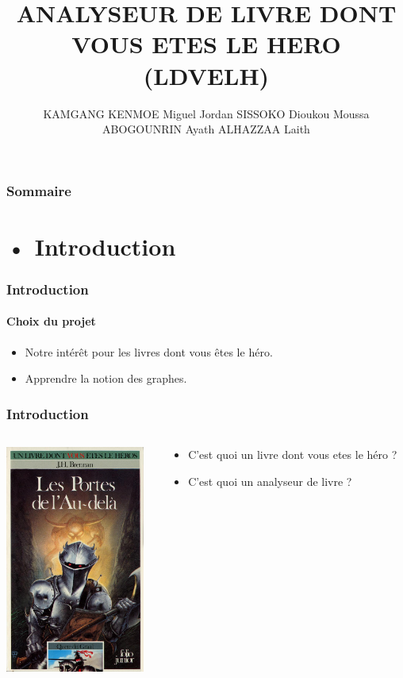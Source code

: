 \documentclass{beamer}
\title{ANALYSEUR DE LIVRE DONT VOUS ETES LE HERO (LDVELH)}
\author{KAMGANG KENMOE Miguel Jordan \newline SISSOKO Dioukou Moussa
\newline ABOGOUNRIN Ayath \newline ALHAZZAA Laith  }
\institute{UE : Conception logicielle 1
\newline \newline Université de Caen Normandie }
\begin{document}
\begin{frame}
\titlepage

\end{frame}

\begin{frame}
\frametitle{Sommaire}
\tableofcontents
\end{frame}

\section{• Introduction}

\begin{frame}
\frametitle{Introduction}
\framesubtitle {Choix du projet}

\begin{itemize}
\item Notre intérêt pour les livres dont vous êtes le héro.
\item Apprendre la notion des graphes.
\end{itemize}
\end{frame}

\begin{frame}
\frametitle{Introduction}

\begin{columns}
\begin{column}{0.5\textwidth}

\includegraphics[width=\textwidth ,height=7.5cm]{images/livre.jpg}
\end{column}

\begin{column}{0.5\textwidth}
\begin{itemize}
\item C'est quoi un livre dont vous etes le héro ?
\item C'est quoi un analyseur de livre ?
\end{itemize}
\end{column}
\end{columns}
\end{frame}
\end{document}
